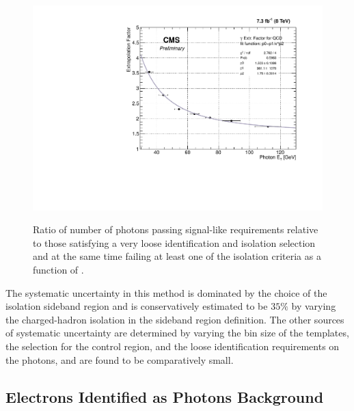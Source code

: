 \begin{figure}[H]
\centering
{\includegraphics[scale=0.45]{figures/fitResult.pdf}}
\caption{ Ratio of number of photons passing signal-like requirements relative to those satisfying a very loose identification and isolation selection and at the same time failing at least one of the isolation criteria as a function of \etg.}
\label{fig:qcd_fr}
\end{figure}

  The systematic uncertainty in this method is dominated by the choice of the isolation sideband region and is conservatively estimated to be $35\%$ by varying the  charged-hadron isolation in the sideband region definition. The other sources of systematic uncertainty are determined by varying the bin size of the templates, the \met selection for the control region, and the loose identification requirements on the photons, and are found to be comparatively small.

\subsection{Electrons Identified as Photons Background}
\label{sec:ewk}

